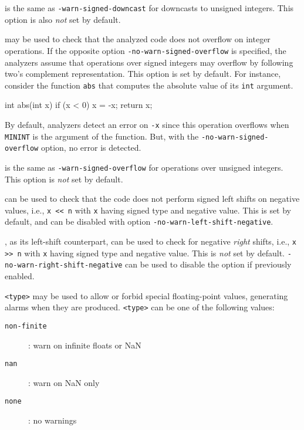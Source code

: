 \begin{description}
\item {} is the same as
  \texttt{-warn-signed-downcast} for downcasts to unsigned integers. This option
  is also \emph{not} set by default. 

\item {} may be used to check that the
  analyzed code does not overflow on integer operations. If the opposite option
  \texttt{-no-warn-signed-overflow} is specified, the analyzers assume that
  operations over signed integers may overflow by following two's complement
  representation. This option is set by default. For instance, consider the
  function \lstinline|abs| that computes the absolute value of its
  \lstinline|int| argument.
\begin{ccode}
int abs(int x) {
  if (x < 0) x = -x;
  return x;
}
\end{ccode}
By default, analyzers detect an error on
\lstinline|-x| since this operation overflows when \lstinline|MININT| is the
argument of the function. But, with the \texttt{-no-warn-signed-overflow}
option, no error is detected.  

\item {} is the same as
  \texttt{-warn-signed-overflow} for operations over unsigned integers. This
  option is \emph{not} set by default.

\item {} can be used to check that the
  code does not perform signed left shifts on negative values, i.e.,
  \lstinline|x << n| with \lstinline|x| having signed type and negative
  value. This is set by default, and can be disabled with option
  \texttt{-no-warn-left-shift-negative}.

\item {}, as its left-shift counterpart,
  can be used to check for negative {\em right} shifts, i.e.,
  \lstinline|x >> n| with \lstinline|x| having signed type and negative value.
  This is {\em not} set by default.
  \texttt{-no-warn-right-shift-negative} can be used to disable the option if
  previously enabled.

\item {} \texttt{<type>} may be used to allow
  or forbid special floating-point values, generating alarms when they are
  produced. \texttt{<type>} can be one of the following values:
  \begin{description}
  \item[\texttt{non-finite}]: warn on infinite floats or NaN
  \item[\texttt{nan}]: warn on NaN only
  \item[\texttt{none}]: no warnings
  \end{description}


\end{description}
